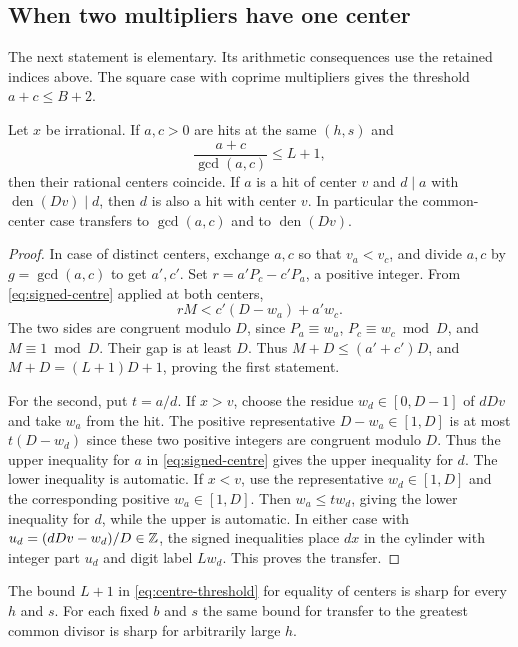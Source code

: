 \subsection{When two multipliers have one center}

The next statement is elementary. Its arithmetic consequences
use the retained indices above. The square case with coprime
multipliers gives the threshold \(a+c\le B+2\).

\begin{proposition}\label{prop:common-centre}
Let \(x\) be irrational. If \(a,c>0\) are hits at the same
\((h,s)\) and
\begin{equation}\label{eq:centre-threshold}
       \frac{a+c}{\gcd(a,c)}\le L+1,
\end{equation}
then their rational centers coincide. If \(a\) is a hit of
center \(v\) and \(d\mid a\) with \(\operatorname{den}(Dv)\mid d\),
then \(d\) is also a hit with center \(v\).
In particular the common-center case transfers to \(\gcd(a,c)\)
and to \(\operatorname{den}(Dv)\).
\end{proposition}

\begin{proof}
In case of distinct centers, exchange \(a,c\) so that
\(v_a<v_c\), and divide \(a,c\) by \(g=\gcd(a,c)\) to get
\(a',c'\). Set \(r=a'P_c-c'P_a\), a positive integer.
From \eqref{eq:signed-centre} applied at both centers,
\[
       rM<c'(D-w_a)+a'w_c .
\]
The two sides are congruent modulo \(D\), since
\(P_a\equiv w_a\), \(P_c\equiv w_c\bmod D\), and \(M\equiv1\bmod D\).
Their gap is at least \(D\). Thus \(M+D\le(a'+c')D\),
and \(M+D=(L+1)D+1\), proving the first statement.

For the second, put \(t=a/d\). If \(x>v\), choose the residue
\(w_d\in[0,D-1]\) of \(dDv\) and take \(w_a\) from the hit.
The positive representative \(D-w_a\in[1,D]\) is at most
\(t(D-w_d)\) since these two positive integers are congruent
modulo \(D\). Thus the upper inequality for \(a\) in
\eqref{eq:signed-centre} gives the upper inequality for \(d\).
The lower inequality is automatic. If \(x<v\), use the
representative \(w_d\in[1,D]\) and the corresponding positive
\(w_a\in[1,D]\). Then \(w_a\le t w_d\), giving the lower
inequality for \(d\), while the upper is automatic. In either
case with \(u_d=(dDv-w_d)/D\in\mathbb Z\), the signed inequalities place
\(dx\) in the cylinder with integer part \(u_d\) and digit
label \(Lw_d\). This proves the transfer.
\end{proof}

\begin{proposition}[Sharpness]\label{prop:sharp-centre}
The bound \(L+1\) in \eqref{eq:centre-threshold} for equality of
centers is sharp for every \(h\) and \(s\).
For each fixed \(b\) and \(s\) the same bound for transfer to
the greatest common divisor is sharp for arbitrarily large \(h\).
\end{proposition}

